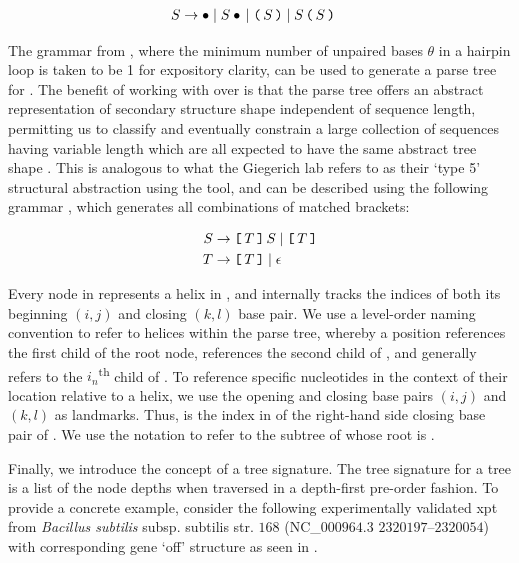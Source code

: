\begin{align}
\label{eq:rfinder:strCfg}
S &\rightarrow \bullet \;|\; S \bullet \,|\; \bpL S \bpR \;|\; S\, \bpL S \bpR
\end{align}

The grammar from ,
where the minimum number of unpaired bases $\theta$ in a hairpin loop
is taken to be 1 for expository clarity,
can be used to generate a parse tree
\tree for \strS. The benefit of working with \tree over \strS is that the parse
tree offers an abstract representation of secondary structure shape independent of
sequence length, permitting us to classify and eventually constrain a large
collection of sequences having variable length which are all expected to have the
same abstract tree shape \citep{voss:2006iq}. This is analogous to what
the Giegerich lab refers to as
their `type 5' structural abstraction using the \rshapes tool, and can be
described using the following grammar \citep{Lorenz:2008gz}, which generates
all combinations of matched brackets:

\begin{align}
\label{eq:rfinder:shapeCfg}
\begin{split}
S &\rightarrow \brL T \brR\, S \;|\; \brL T \brR \\
T &\rightarrow \brL T \brR \;|\; \epsilon \\
\end{split}
\end{align}

Every node in \tree
represents a helix in \strS, and internally tracks the indices of both its
beginning $(i,j)$ and closing $(k,l)$ base pair. We use a level-order naming
convention to refer to helices within the parse tree, whereby a position
 references the first child of the root node, 
references the second child of , and generally
 refers to the $i_n$\textsuperscript{th} child of
. To reference specific nucleotides in the
context of their location relative to a helix, we use the opening and closing base
pairs $(i,j)$ and $(k,l)$ as landmarks. Thus,  is the index in
\strS of the right-hand side closing base pair of . We use the
notation  to refer to the subtree of \tree whose root is
.

Finally, we introduce the concept of a tree signature. The tree signature for a
tree \tree is a list of the node depths when traversed in a depth-first pre-order
fashion. To provide a concrete example, consider the following experimentally
validated xpt \grb from {\em Bacillus subtilis} subsp. subtilis str. $168$
(NC\_$000964.3$ $2320197$--$2320054$) with corresponding gene `off' structure as seen in
.
\medskip

